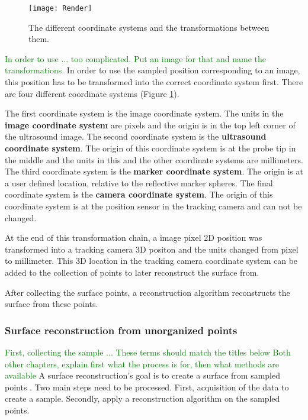 \begin{figure}[H]
  \centering
  \texttt{[image: Render]}
  \caption{The different coordinate systems and the transformations between them.}
  \label{fig:Render}
\end{figure}

\textcolor{green}{In order to use ... too complicated. Put an image for that and name the transformations.}
In order to use the sampled position corresponding to an image, this
position has to be transformed into the correct coordinate system first. There
are four different coordinate systems (Figure \ref{fig:Render}).

The first coordinate system is the image
coordinate system. The units in the \textbf{image coordinate system} are pixels and the
origin is in the top left corner of the ultrasound image.
The second coordinate system is the \textbf{ultrasound coordinate system}. The origin of this
coordinate system is at the probe tip in the middle and the units in this and
the other coordinate systems are millimeters.
The third coordinate system is the
\textbf{marker coordinate system}. The origin is at a user defined
location, relative to the reflective marker spheres.
The final coordinate system is the \textbf{camera coordinate system}. The origin of this
coordinate system is at the position sensor in the tracking camera and can not
be changed.

At the end of this transformation chain, a image pixel 2D position was
transformed into a tracking camera 3D positon and the units changed
from pixel to millimeter. This 3D location in the tracking camera coordinate system
can be added to the collection of points to later reconstruct the surface from.

After collecting the surface points, a reconstruction algorithm reconstructs the surface from these points.
\subsubsection{Surface reconstruction from unorganized points}
\textcolor{green}{First, collecting the sample ... These terms should match the titles below
Both other chapters, explain first what the process is for, then what methods are available}
A surface reconstruction's goal is to create a surface from sampled points \cite{berger2017survey}. Two
main steps need to be processed. First, acquisition of the data to create a sample. Secondly,
apply a reconstruction algorithm on the sampled points.


